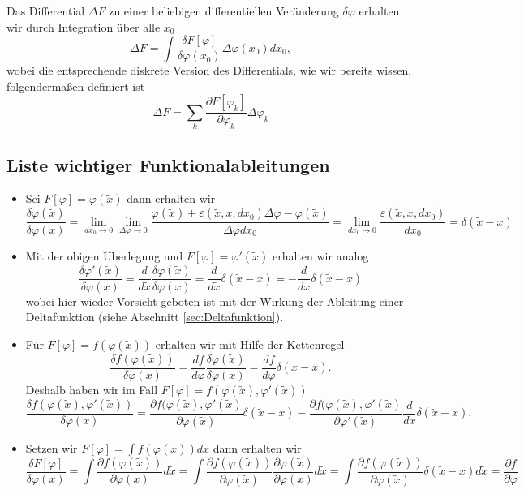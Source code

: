 %
Das Differential $\Delta F$ zu einer beliebigen differentiellen Veränderung
$\delta\varphi$ erhalten wir durch Integration über alle $x_0$
\begin{equation}\label{eq:DifferentialVariation}
  \Delta F = \int\frac{\delta F[\varphi]}{\delta\varphi(x_0)}\Delta\varphi(x_0)dx_0,
\end{equation}
wobei die entsprechende diskrete Version des Differentials, wie wir bereits
wissen, folgendermaßen definiert ist
\begin{equation}\label{eq:DifferentialMultiD}
    \Delta F = \sum\limits_k \frac{\partial F[\varphi_k]}{\partial\varphi_k}\Delta\varphi_k
\end{equation}
%
\subsection{Liste wichtiger Funktionalableitungen}\label{sec:WichtigeAbleitungen}
\begin{itemize}
  \item Sei $F[\varphi]=\varphi(\tilde{x})$ dann erhalten wir
    \[
      \frac{\delta\varphi(\tilde{x})}{\delta\varphi(x)}=\lim_{dx_0\rightarrow 0}\lim_{\Delta\varphi\rightarrow 0}
      \frac{\varphi(\tilde{x})+\varepsilon(\tilde{x},x,dx_0)\Delta\varphi-\varphi(\tilde{x})}{\Delta\varphi dx_0}=\lim_{dx_0\rightarrow 0}\frac{\varepsilon(\tilde{x},x,dx_0)}{dx_0}=\delta(\tilde{x}-x)
    \]
  \item Mit der obigen Überlegung und $F[\varphi]=\varphi'(\tilde{x})$ erhalten wir analog
    \[
      \frac{\delta\varphi'(\tilde{x})}{\delta\varphi(x)}=\frac{d}{d\tilde{x}} \frac{\delta\varphi(\tilde{x})}{\delta\varphi(x)}=\frac{d}{d\tilde{x}}\delta(\tilde{x}-x)=-\frac{d}{dx}\delta(\tilde{x}-x)
    \]
    wobei hier wieder Vorsicht geboten ist mit der Wirkung der Ableitung einer
    Deltafunktion (siehe Abschnitt \ref{sec:Deltafunktion}).
  \item Für $F[\varphi]=f(\varphi(\tilde{x}))$ erhalten wir mit Hilfe der Kettenregel
    \[
      \frac{\delta f(\varphi(\tilde{x}))}{\delta\varphi(x)}
      =\frac{df}{d\varphi}\frac{\delta \varphi(\tilde{x})}{\delta\varphi(x)}
      =\frac{df}{d\varphi}\delta(\tilde{x}-x).
    \]
    Deshalb haben wir im Fall  $F[\varphi]=f(\varphi(\tilde{x}),\varphi'(\tilde{x}))$
      \[
	\frac{\delta f(\varphi(\tilde{x}),\varphi'(\tilde{x}))}{\delta\varphi(x)}=
	\frac{\partial f(\varphi(\tilde{x}),\varphi'(\tilde{x})}{\partial\varphi(\tilde{x})}\delta(\tilde{x}-x)-
	  \frac{\partial f(\varphi(\tilde{x}),\varphi'(\tilde{x})}{\partial\varphi'(\tilde{x})}\frac{d}{dx}\delta(\tilde{x}-x).
    \]
  \item Setzen wir $F[\varphi]=\int f(\varphi(\tilde{x}))d\tilde{x}$ dann erhalten  wir 
    \[
      \frac{\delta F[\varphi]}{\delta\varphi(x)}=\int \frac{\partial f(\varphi(\tilde{x}))}{\partial\varphi(x)}d\tilde{x}=
      \int\frac{\partial f(\varphi(\tilde{x}))}{\partial\varphi(\tilde{x})}\frac{\partial\varphi(\tilde{x})}{\partial\varphi(x)}d\tilde{x}=
      \int\frac{\partial f(\varphi(\tilde{x}))}{\partial\varphi(\tilde{x})}\delta(\tilde{x}-x)d\tilde{x}=\frac{\partial f}{\partial\varphi}
    \]
\end{itemize}

